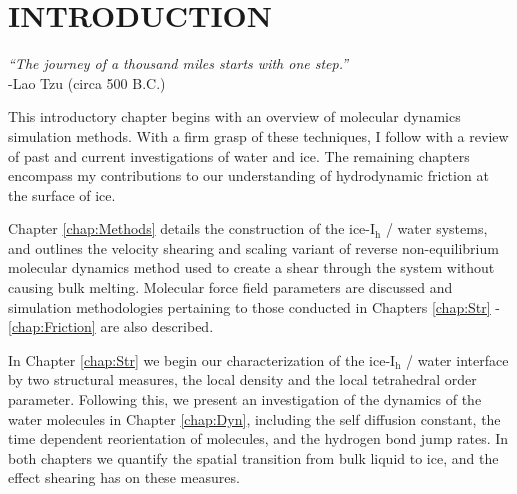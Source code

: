\chapter{INTRODUCTION}\label{chap:intro}
%
%
%
%
%
%



\begin{flushright}
\textit{``The journey of a thousand miles starts with one step.''} \\
-Lao Tzu (circa 500 B.C.) \\
\end{flushright}

This introductory chapter begins with an overview of molecular
dynamics simulation methods. With a firm grasp of these techniques, I
follow with a review of past and current investigations of water and
ice. The remaining chapters encompass my contributions to
our understanding of hydrodynamic friction at the surface of ice.

Chapter \ref{chap:Methods} details the construction of the
ice-I$_\mathrm{h}$ / water systems, and outlines the velocity shearing
and scaling variant of reverse non-equilibrium molecular dynamics
method used to create a shear through the system without causing bulk
melting. Molecular force field parameters are discussed and simulation
methodologies pertaining to those conducted in Chapters
\ref{chap:Str} - \ref{chap:Friction} are also described.

In Chapter \ref{chap:Str} we begin our characterization of the
ice-I$_\mathrm{h}$ / water interface by two structural measures, the
local density and the local tetrahedral order parameter. Following
this, we present an investigation of the dynamics of the water
molecules in Chapter \ref{chap:Dyn}, including the self diffusion
constant, the time dependent reorientation of molecules, and the
hydrogen bond jump rates. In both chapters we quantify the spatial
transition from bulk liquid to ice, and the effect shearing has
on these measures.

